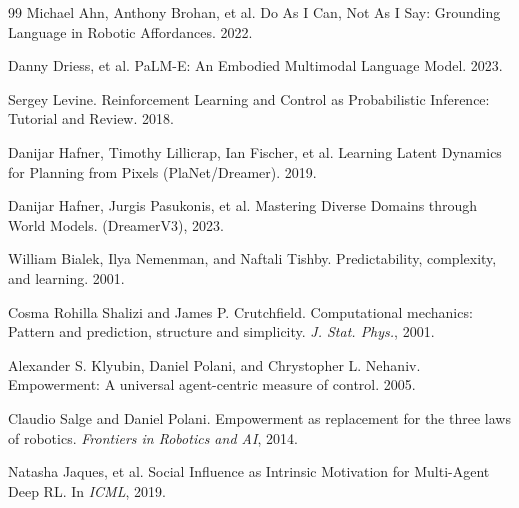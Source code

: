 \documentclass[11pt]{article}
\begin{document}
\begin{thebibliography}{99}
Michael Ahn, Anthony Brohan, et al. Do As I Can, Not As I Say: Grounding Language in Robotic Affordances. 2022.

Danny Driess, et al. PaLM-E: An Embodied Multimodal Language Model. 2023.

Sergey Levine. Reinforcement Learning and Control as Probabilistic Inference: Tutorial and Review. 2018.

Danijar Hafner, Timothy Lillicrap, Ian Fischer, et al. Learning Latent Dynamics for Planning from Pixels (PlaNet/Dreamer). 2019.

Danijar Hafner, Jurgis Pasukonis, et al. Mastering Diverse Domains through World Models. (DreamerV3), 2023.

William Bialek, Ilya Nemenman, and Naftali Tishby. Predictability, complexity, and learning. 2001.

Cosma Rohilla Shalizi and James P. Crutchfield. Computational mechanics: Pattern and prediction, structure and simplicity. \emph{J. Stat. Phys.}, 2001.

Alexander S. Klyubin, Daniel Polani, and Chrystopher L. Nehaniv. Empowerment: A universal agent-centric measure of control. 2005.

Claudio Salge and Daniel Polani. Empowerment as replacement for the three laws of robotics. \emph{Frontiers in Robotics and AI}, 2014.

Natasha Jaques, et al. Social Influence as Intrinsic Motivation for Multi-Agent Deep RL. In \emph{ICML}, 2019.

\end{thebibliography}
\end{document}
